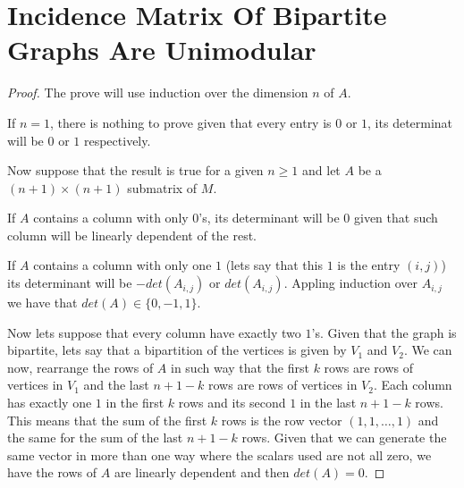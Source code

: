 ﻿\chapter{Incidence Matrix Of Bipartite Graphs Are Unimodular}
\label{IncidenceMatrixOfBipartiteGraphsAreUnimodular}

\begin{proof}
    The prove will use induction over the dimension $n$ of $A$.\pn

    If $n = 1$, there is nothing to prove given that every entry is $0$ or $1$, its determinat
    will be $0$ or $1$ respectively.\pn

    Now suppose that the result is true for a given $n \geq 1$ and let $A$ be a $(n+1) \times (n+1)$
    submatrix of $M$.\pn

    If $A$ contains a column with only $0$'s, its determinant will be $0$ given that such column
    will be linearly dependent of the rest.\pn

    If $A$ contains a column with only one $1$ (lets say that this $1$ is the entry $(i,j)$)
    its determinant will be $-det(A_{i,j})$ or $det(A_{i,j})$. Appling induction over $A_{i,j}$
    we have that $det(A) \in \{0, -1, 1\}$.\pn

    Now lets suppose that every column have exactly two $1$'s. Given that the graph is bipartite, 
    lets say that a bipartition of the vertices is given by $V_1$ and $V_2$. We can now, rearrange
    the rows of $A$ in such way that the first $k$ rows are rows of vertices in $V_1$ and the last
    $n+1-k$ rows are rows of vertices in $V_2$. Each column has exactly one $1$ in the first $k$ rows
    and its second $1$ in the last $n+1-k$ rows. This means that the sum of the first $k$ rows is
    the row vector $(1, 1, \dots, 1)$ and the same for the sum of the last $n+1-k$ rows. Given that
    we can generate the same vector in more than one way where the scalars used are not all zero,
    we have the rows of $A$ are linearly dependent and then $det(A) = 0$.
\end{proof}